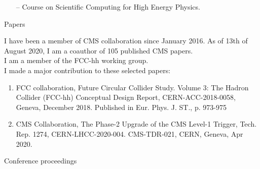 \documentclass[10pt,a4paper]{altacv}
\begin{document}

\begin{itemize}
    \setlength{\itemindent}{0.5em}
    \item[--]   Course on Scientific Computing for High Energy Physics.
\end{itemize}

\medskip



\medskip

\medskip

\medskip


{\large\color{emphasis}Papers\par}

\medskip

I have been a member of CMS collaboration since January 2016.
As of 13th of August 2020, I am a coauthor of 105 published CMS papers.\\
I am a member of the FCC-hh working group.\\
\smallskip
I made a major contribution to these selected papers:
\smallskip
\begin{enumerate}
  \setlength{\itemindent}{0.5em}
  \item FCC collaboration, Future Circular Collider Study. Volume 3: The Hadron Collider (FCC-hh) Conceptual Design Report, CERN-ACC-2018-0058, Geneva, December 2018. Published in Eur. Phys. J. ST., p. 973-975
  \item CMS Collaboration, The Phase-2 Upgrade of the CMS Level-1 Trigger, Tech. Rep. 1274, CERN-LHCC-2020-004. CMS-TDR-021, CERN, Geneva, Apr 2020.
\end{enumerate}

\medskip

\newpage

{\large\color{emphasis}Conference proceedings\par}

\medskip
\end{document}
